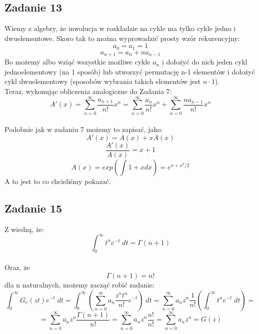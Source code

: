 \documentclass[a4paper]{article}
\begin{document}
\subsection*{Zadanie 13}
Wiemy z algebry, że inwolucja w rozkładzie na cykle ma tylko cykle jedno i dwuelementowe. Skoro tak to można wyprowadzić prosty wzór rekurencyjny:\\
$$a_0=a_1=1$$
$$a_{n+1}=a_n+na_{n-1}$$
Bo możemy albo wziąć wszystkie możliwe cykle $a_n$ i dołożyć do nich jeden cykl jednoelementowy (na 1 sposób) lub utworzyć permutację n-1 elementów i dołożyć cykl dwuelementowy (sposobów wybrania takich elementów jest $n\cdot 1$).\\
Teraz, wykonując obliczenia analogiczne do Zadania 7:\\
$$A'(x)=\sum\limits_{n=0}^{\infty} \frac{a_{n+1}}{n!}x^n = \sum\limits_{n=0}^{\infty} \frac{a_n}{n!} x^n + \sum\limits_{n=0}^{\infty} \frac{na_{n-1}}{n!} x^n$$\\
Podobnie jak w zadaniu 7 możemy to zapisać, jako:\\
$$A'(x)=A(x) +xA(x)$$
$$\frac{A'(x)}{A(x)}=x+1$$
$$A(x)=exp(\int 1+x dx) = e^{x+x^2/2}$$
A to jest to co chcieliśmy pokazać. 

\clearpage
\subsection*{Zadanie 15}
Z wiedzą, że:\\
$$\int_0^{\infty} t^n e^{-t} \;dt = \Gamma(n+1)$$\\
Oraz, że $$\Gamma(n+1) = n!$$ dla n naturalnych, możemy zacząć robić zadanie:\\
$$\int_0^{\infty} G_e(zt)e^{-t} \; dt = \int_0^{\infty} (\sum_{n=0}^{\infty} a_n \frac{ z^nt^n} {n!} e^{-t}) \; dt = \sum_{n=0}^{\infty} a_n z^n \frac 1 {n!} (\int_0^{\infty} t^n e^{-t} \; dt) =$$ $$= \sum_{n=0}^{\infty} a_n z^n \frac {\Gamma(n+1)} {n!} = \sum_{n=0}^{\infty} a_n z^n \frac {n!} {n!} = \sum_{n=0}^{\infty} a_n z^n = G(z)$$\\
\end{document}
